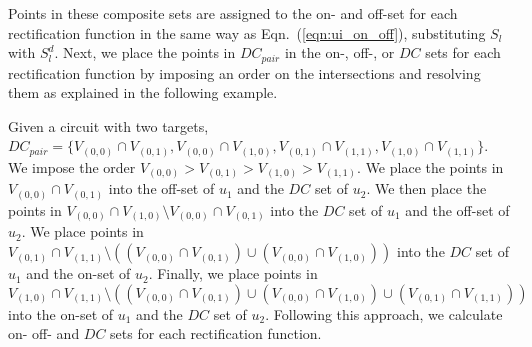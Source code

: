 Points in these composite sets are assigned to the on- and off-set for each rectification function in the same way as 
Eqn.~(\ref{eqn:ui_on_off}), substituting $S_l$ with $S_l^d$. Next, we place the points in $DC_{pair}$ in the on-, off-, or $DC$ sets for each rectification function by imposing an order on the intersections and resolving them as explained in the following example. 






Given a circuit with two targets, $DC_{pair} = \{V_{(0,0)} \cap V_{(0,1)}, V_{(0,0)} \cap V_{(1,0)}, V_{(0,1)} \cap V_{(1,1)}, V_{(1,0)} \cap V_{(1,1)}\}$. We impose the order $V_{(0,0)} > V_{(0,1)} > V_{(1,0)} > V_{(1,1)}$. We place the points in $V_{(0,0)} \cap V_{(0,1)}$ into the off-set of $u_1$ and the $DC$ set of $u_2$. We then place the points in $V_{(0,0)} \cap V_{(1,0)} \setminus V_{(0,0)} \cap V_{(0,1)}$ into the $DC$ set of $u_1$ and the off-set of $u_2$. We place points in $V_{(0,1)} \cap V_{(1,1)} \setminus ((V_{(0,0)} \cap V_{(0,1)}) \cup (V_{(0,0)} \cap V_{(1,0)}))$ into the $DC$ set of $u_1$ and the on-set of $u_2$. Finally, we place points in $V_{(1,0)} \cap V_{(1,1)} \setminus ((V_{(0,0)} \cap V_{(0,1)}) \cup (V_{(0,0)} \cap V_{(1,0)}) \cup (V_{(0,1)} \cap V_{(1,1)}))$ into the on-set of $u_1$ and the $DC$ set of $u_2$. 
Following this approach, we calculate on- off- and $DC$ sets for each rectification function. 





